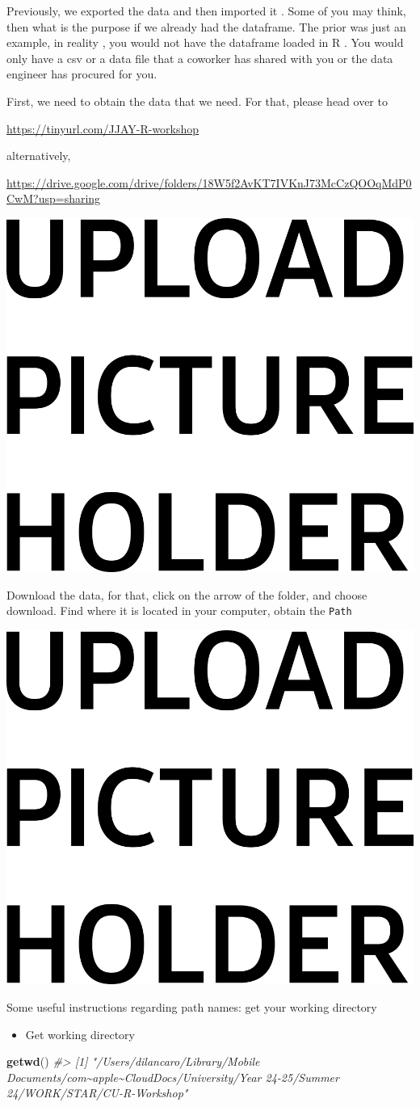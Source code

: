 \documentclass[
]{book}
\newenvironment{Shaded}{\begin{snugshade}}{\end{snugshade}}
\newcommand{\CommentTok}[1]{\textcolor[rgb]{0.56,0.35,0.01}{\textit{#1}}}
\newcommand{\FunctionTok}[1]{\textcolor[rgb]{0.13,0.29,0.53}{\textbf{#1}}}
\newcommand{\NormalTok}[1]{#1}
\providecommand{\tightlist}{%
  \setlength{\itemsep}{0pt}\setlength{\parskip}{0pt}}
\begin{document}
Previously, we exported the data and then imported it . Some of you may think, then what is the purpose if we already had the dataframe. The prior was just an example, in reality , you would not have the dataframe loaded in R . You would only have a csv or a data file that a coworker has shared with you or the data engineer has procured for you.

First, we need to obtain the data that we need. For that, please head over to

\url{https://tinyurl.com/JJAY-R-workshop}

alternatively,

\url{https://drive.google.com/drive/folders/18W5f2AvKT7IVKnJ73McCzQOOqMdP0CwM?usp=sharing}

\includegraphics[width=0.4\linewidth,height=0.2\textheight]{images/HOLDER}

Download the data, for that, click on the arrow of the folder, and choose download. Find where it is located in your computer, obtain the \texttt{Path}

\includegraphics[width=0.4\linewidth,height=0.2\textheight]{images/HOLDER}

Some useful instructions regarding path names: get your working directory

\begin{itemize}
\tightlist
\item
  Get working directory
\end{itemize}

\begin{Shaded}
\begin{Highlighting}[]
\FunctionTok{getwd}\NormalTok{()}
\CommentTok{\#\textgreater{} [1] "/Users/dilancaro/Library/Mobile Documents/com\textasciitilde{}apple\textasciitilde{}CloudDocs/University/Year 24{-}25/Summer 24/WORK/STAR/CU{-}R{-}Workshop"}
\end{Highlighting}
\end{Shaded}
\end{document}
